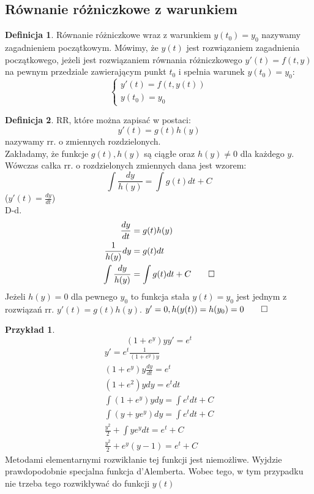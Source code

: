 \documentclass{article}
\theoremstyle{definition}
\newtheorem{de}{Definicja}[subsection]
\theoremstyle{definition}
\theoremstyle{definition}
\newtheorem{pk}{Przykład}[subsection]
\theoremstyle{definition}
\theoremstyle{definition}
\theoremstyle{definition}
\theoremstyle{definition}
\begin{document}
\subsection{Równanie różniczkowe z warunkiem}

\begin{de}
    Równanie różniczkowe wraz z warunkiem $y(t_0)=y_0$ nazywamy zagadnieniem początkowym.
    Mówimy, że $y(t)$ jest rozwiązaniem zagadnienia początkowego, jeżeli jest rozwiązaniem równania różniczkowego 
    $y'(t)=f(t,y)$ na pewnym przedziale zawierającym punkt $t_0$ i spełnia warunek $y(t_0)=y_0$:
    $$
    \begin{cases}
        y'(t) = f(t,y(t))\\
        y(t_0) = y_0
    \end{cases}
    $$
\end{de}

\begin{de}
    RR, które można zapisać w postaci: 
    \[y'(t)=g(t)h(y)\]
    nazywamy rr. o zmiennych rozdzielonych.\\
    Zakładamy, że funkcje $g(t), h(y)$ są ciągłe oraz $h(y)\neq 0$ dla każdego $y$. Wówczas całka rr. o rozdzielonych zmiennych dana jest wzorem:
    \[\int \frac{dy}{h(y)} = \int g(t) dt + C\]
    ($y'(t)=\frac{dy}{dt}$)\\
    D-d.\\
    \begin{align}
        \frac{dy}{dt} &= g(t)h(y)\\
        \frac{1}{h(y)} dy &= g(t)dt\\
        \int \frac{dy}{h(y)} &= \int g(t) dt + C\qed
    \end{align}
    Jeżeli $h(y)=0$ dla pewnego $y_0$ to funkcja stała $y(t)=y_0$ jest jednym z rozwiązań rr. $y'(t)=g(t)h(y)$.
    $y'=0, h(y(t))=h(y_0)=0\qed$
\end{de}

\begin{pk}
    \[(1+e^y)yy'=e^t\]
    \begin{align}
        y' = e^t \frac{1}{(1+e^y)y}\\
        (1+e^y)y\frac{dy}{dt} = e^t\\
        (1+e^2)y dy = e^t dt\\
        \int (1+e^y) y dy = \int e^t dt + C\\
        \int (y + ye^y) dy = \int e^t dt + C\\
        \frac{y^2}{2} + \int ye^y dt = e^t + C\\
        \frac{y^2}{2} + e^y(y-1) = e^t + C
    \end{align}
    Metodami elementarnymi rozwikłanie tej funkcji jest niemożliwe. Wyjdzie prawdopodobnie specjalna funkcja d'Alemberta.
    Wobec tego, w tym przypadku nie trzeba tego rozwikływać do funkcji $y(t)$
\end{pk}
\end{document}
